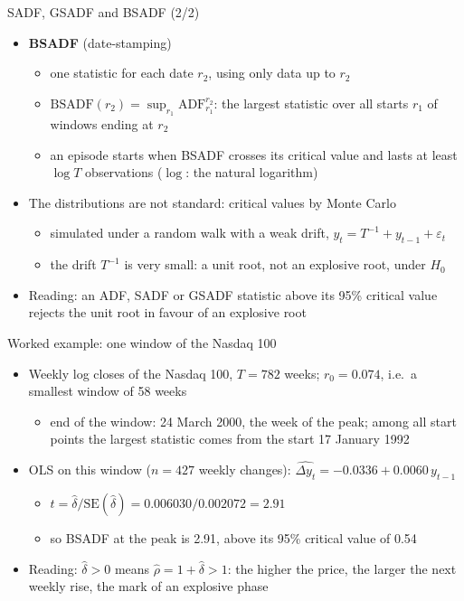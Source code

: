 \begin{frame}{SADF, GSADF and BSADF (2/2)}
\itemsize{\small}
\begin{itemize}
    \item \textbf{BSADF} (date-stamping)
    \begin{itemize}
        \item one statistic for each date $r_2$, using only data up to $r_2$
        \item $\mathrm{BSADF}(r_2) = \sup_{r_1} \mathrm{ADF}_{r_1}^{r_2}$: the largest statistic over all starts $r_1$ of windows ending at $r_2$
        \item an episode starts when BSADF crosses its critical value and lasts at least $\log T$ observations  ($\log$: the natural logarithm)
    \end{itemize}
    \item The distributions are not standard: critical values by Monte Carlo
    \begin{itemize}
        \item simulated under a random walk with a weak drift, $y_t = T^{-1} + y_{t-1} + \varepsilon_t$
        \item the drift $T^{-1}$ is very small: a unit root, not an explosive root, under $H_0$
    \end{itemize}
    \item Reading: an ADF, SADF or GSADF statistic above its 95\% critical value rejects the unit root in favour of an explosive root
\end{itemize}
\end{frame}

\begin{frame}{Worked example: one window of the Nasdaq 100}
\itemsize{\small}
\begin{itemize}
    \item Weekly log closes of the Nasdaq 100, $T = 782$ weeks; $r_0 = 0.074$, i.e.\ a smallest window of 58 weeks
    \begin{itemize}
        \item end of the window: 24 March 2000, the week of the peak; among all start points the largest statistic comes from the start 17 January 1992
    \end{itemize}
    \item OLS on this window ($n = 427$ weekly changes): $\widehat{\Delta y_t} = -0.0336 + 0.0060\, y_{t-1}$
    \begin{itemize}
        \item $t = \hat\delta / \mathrm{SE}(\hat\delta) = 0.006030 / 0.002072 = 2.91$
        \item so BSADF at the peak is 2.91, above its 95\% critical value of 0.54
    \end{itemize}
    \item Reading: $\hat\delta > 0$ means $\hat\rho = 1 + \hat\delta > 1$: the higher the price, the larger the next weekly rise, the mark of an explosive phase
\end{itemize}
\end{frame}

